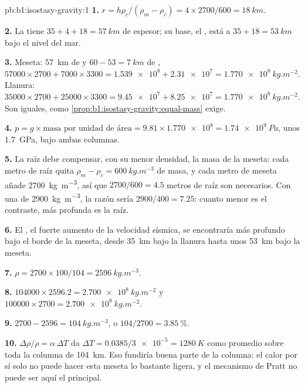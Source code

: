 \begin{solution}{pb:b1:isostasy-gravity:1}
\textbf{1.} $r = h\rho_c/(\rho_m - \rho_c) = 4\times2700/600 = \qty{18}{km}$.

\textbf{2.} La  tiene $35 + 4 + 18 = \qty{57}{km}$ de espesor; su base, el ,
está a $35 + 18 = \qty{53}{km}$ bajo el nivel del mar.

\textbf{3.} Meseta: \qty{57}{km} de  y $60 - 53 = \qty{7}{km}$ de ,
$\num{57000}\times2700 + \num{7000}\times3300 = \num{1.539e8} + \num{2.31e7} =
\qty{1.770e8}{kg.m^{-2}}$. Llanura: $\num{35000}\times2700 + \num{25000}\times3300
= \num{9.45e7} + \num{8.25e7} = \qty{1.770e8}{kg.m^{-2}}$. Son iguales, como
\cref{prop:b1:isostasy-gravity:equal-mass} exige.

\textbf{4.} $p = g\times\text{masa por unidad de área} = 9.81\times\num{1.770e8} =
\qty{1.74e9}{Pa}$, unos \qty{1.7}{GPa}, bajo ambas columnas.

\textbf{5.} La raíz debe compensar, con su menor densidad, la masa de la meseta: cada metro de raíz quita $\rho_m - \rho_c = \qty{600}{kg.m^{-3}}$
de masa, y cada metro de meseta añade \qty{2700}{kg.m^{-3}}, así que $2700/600 = 4.5$
metros de raíz son necesarios. Con una  de \qty{2900}{kg.m^{-3}}, la razón
sería $2900/400 = 7.25$: cuanto menor es el contraste, más profunda es la raíz.

\textbf{6.} El , el fuerte aumento de la velocidad sísmica, se encontraría más profundo bajo el borde de la meseta, desde
\qty{35}{km} bajo la llanura hasta unos \qty{53}{km} bajo la meseta.

\textbf{7.} $\rho = 2700\times100/104 = \qty{2596}{kg.m^{-3}}$.

\textbf{8.} $\num{104000}\times2596.2 = \qty{2.700e8}{kg.m^{-2}}$ y
$\num{100000}\times2700 = \qty{2.700e8}{kg.m^{-2}}$.

\textbf{9.} $2700 - 2596 = \qty{104}{kg.m^{-3}}$, o $104/2700 =
\qty{3.85}{\percent}$.

\textbf{10.} $\Delta\rho/\rho = \alpha\,\Delta T$ da $\Delta T =
0.0385/\num{3e-5} = \qty{1280}{K}$ como promedio sobre toda la columna de \qty{104}{km}. Eso fundiría buena parte de la columna: el calor
por sí solo no puede hacer esta meseta lo bastante ligera, y el mecanismo de Pratt no puede ser aquí el principal.


\end{solution}
